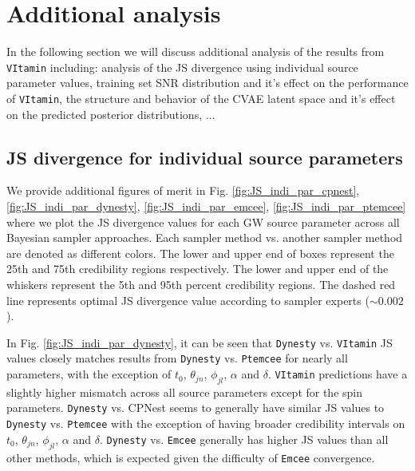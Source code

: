 \section{Additional analysis}

In the following section we will discuss additional analysis of the results 
from \texttt{VItamin} including: analysis of the JS divergence using individual 
source parameter values, training set \ac{SNR} distribution and it's 
effect on the performance of \texttt{VItamin}, the structure and behavior 
of the \ac{CVAE} latent space and it's effect on the predicted 
posterior distributions, ...

\subsection{JS divergence for individual source parameters}
%
%

We provide additional figures of merit in Fig. \ref{fig:JS_indi_par_cpnest}, 
\ref{fig:JS_indi_par_dynesty}, \ref{fig:JS_indi_par_emcee}, \ref{fig:JS_indi_par_ptemcee} where 
we plot the JS divergence values for each \ac{GW} source parameter across all Bayesian 
sampler approaches. Each sampler method vs. another sampler method are 
denoted as different colors. The lower and upper end of boxes represent the 
25th and 75th credibility regions respectively. The lower and upper end of 
the whiskers represent the 5th and 95th percent credibility regions. The 
dashed red line represents optimal JS divergence value according to 
sampler experts ($\sim 0.002$).

%
%

In Fig. \ref{fig:JS_indi_par_dynesty}, it can be seen that \texttt{Dynesty}  vs. \texttt{VItamin} JS values closely 
matches results from \texttt{Dynesty} vs. \texttt{Ptemcee} for nearly all parameters, with the exception of 
$t_0$, $\theta_{jn}$, $\phi_{jl}$, $\alpha$ and $\delta$. \texttt{VItamin} predictions 
have a slightly higher mismatch across all source parameters except for the spin
parameters. \texttt{Dynesty} vs. CPNest seems to generally have similar JS 
values to \texttt{Dynesty} vs. \texttt{Ptemcee} with the exception of having 
broader credibility intervals on $t_0$, $\theta_{jn}$, $\phi_{jl}$, $\alpha$ 
and $\delta$. \texttt{Dynesty} vs. \texttt{Emcee} generally has higher JS values 
than all other methods, which is expected given the difficulty of 
\texttt{Emcee} convergence.


